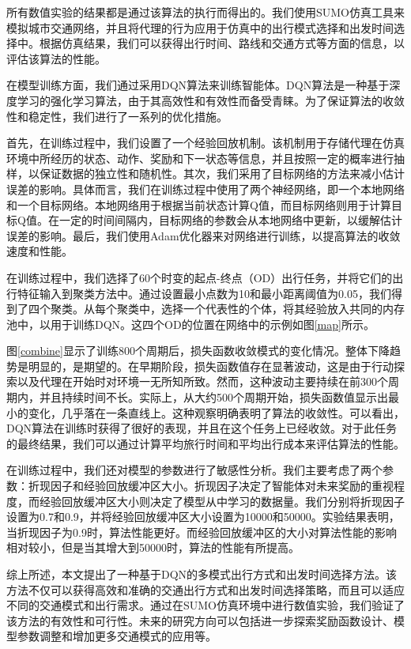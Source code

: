 所有数值实验的结果都是通过该算法的执行而得出的。我们使用SUMO仿真工具来模拟城市交通网络，并且将代理的行为应用于仿真中的出行模式选择和出发时间选择中。根据仿真结果，我们可以获得出行时间、路线和交通方式等方面的信息，以评估该算法的性能。

在模型训练方面，我们通过采用DQN算法来训练智能体。DQN算法是一种基于深度学习的强化学习算法，由于其高效性和有效性而备受青睐。为了保证算法的收敛性和稳定性，我们进行了一系列的优化措施。

首先，在训练过程中，我们设置了一个经验回放机制。该机制用于存储代理在仿真环境中所经历的状态、动作、奖励和下一状态等信息，并且按照一定的概率进行抽样，以保证数据的独立性和随机性。其次，我们采用了目标网络的方法来减小估计误差的影响。具体而言，我们在训练过程中使用了两个神经网络，即一个本地网络和一个目标网络。本地网络用于根据当前状态计算Q值，而目标网络则用于计算目标Q值。在一定的时间间隔内，目标网络的参数会从本地网络中更新，以缓解估计误差的影响。最后，我们使用Adam优化器来对网络进行训练，以提高算法的收敛速度和性能。

在训练过程中，我们选择了60个时变的起点-终点（OD）出行任务，并将它们的出行特征输入到聚类方法中。通过设置最小点数为10和最小距离阈值为0.05，我们得到了四个聚类。从每个聚类中，选择一个代表性的个体，将其经验放入共同的内存池中，以用于训练DQN。这四个OD的位置在网络中的示例如图\ref{map}所示。

图\ref{combine}显示了训练800个周期后，损失函数收敛模式的变化情况。整体下降趋势是明显的，是期望的。在早期阶段，损失函数值存在显著波动，这是由于行动探索以及代理在开始时对环境一无所知所致。然而，这种波动主要持续在前300个周期内，并且持续时间不长。实际上，从大约500个周期开始，损失函数值显示出最小的变化，几乎落在一条直线上。这种观察明确表明了算法的收敛性。可以看出，DQN算法在训练时获得了很好的表现，并且在这个任务上已经收敛。对于此任务的最终结果，我们可以通过计算平均旅行时间和平均出行成本来评估算法的性能。

在训练过程中，我们还对模型的参数进行了敏感性分析。我们主要考虑了两个参数：折现因子和经验回放缓冲区大小。折现因子决定了智能体对未来奖励的重视程度，而经验回放缓冲区大小则决定了模型从中学习的数据量。我们分别将折现因子设置为0.7和0.9，并将经验回放缓冲区大小设置为10000和50000。实验结果表明，当折现因子为0.9时，算法性能更好。而经验回放缓冲区的大小对算法性能的影响相对较小，但是当其增大到50000时，算法的性能有所提高。

综上所述，本文提出了一种基于DQN的多模式出行方式和出发时间选择方法。该方法不仅可以获得高效和准确的交通出行方式和出发时间选择策略，而且可以适应不同的交通模式和出行需求。通过在SUMO仿真环境中进行数值实验，我们验证了该方法的有效性和可行性。未来的研究方向可以包括进一步探索奖励函数设计、模型参数调整和增加更多交通模式的应用等。
